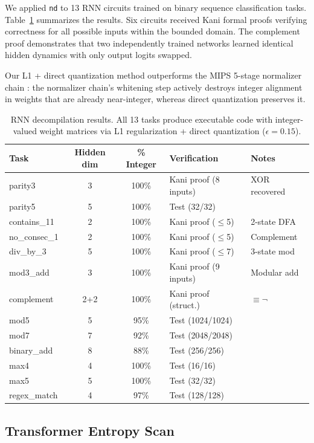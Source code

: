 \documentclass[11pt]{article}
\begin{document}
We applied \texttt{nd} to 13 RNN circuits trained on binary sequence classification tasks. Table~\ref{tab:rnn} summarizes the results. Six circuits received Kani formal proofs verifying correctness for all possible inputs within the bounded domain. The complement proof demonstrates that two independently trained networks learned identical hidden dynamics with only output logits swapped.

Our L1 + direct quantization method outperforms the MIPS 5-stage normalizer chain \cite{michaud2024}: the normalizer chain's whitening step actively destroys integer alignment in weights that are already near-integer, whereas direct quantization preserves it.

\begin{table}[t]
\centering
\caption{RNN decompilation results. All 13 tasks produce executable code with integer-valued weight matrices via L1 regularization + direct quantization ($\epsilon = 0.15$).}
\label{tab:rnn}
\small
\begin{tabular}{@{}lccll@{}}
\toprule
Task & Hidden dim & \% Integer & Verification & Notes \\
\midrule
parity3 & 3 & 100\% & Kani proof (8 inputs) & XOR recovered \\
parity5 & 5 & 100\% & Test (32/32) & \\
contains\_11 & 2 & 100\% & Kani proof ($\leq$5) & 2-state DFA \\
no\_consec\_1 & 2 & 100\% & Kani proof ($\leq$5) & Complement \\
div\_by\_3 & 5 & 100\% & Kani proof ($\leq$7) & 3-state mod \\
mod3\_add & 3 & 100\% & Kani proof (9 inputs) & Modular add \\
complement & 2+2 & 100\% & Kani proof (struct.) & $\equiv \neg$ \\
mod5 & 5 & 95\% & Test (1024/1024) & \\
mod7 & 7 & 92\% & Test (2048/2048) & \\
binary\_add & 8 & 88\% & Test (256/256) & \\
max4 & 4 & 100\% & Test (16/16) & \\
max5 & 5 & 100\% & Test (32/32) & \\
regex\_match & 4 & 97\% & Test (128/128) & \\
\bottomrule
\end{tabular}
\end{table}

\subsection{Transformer Entropy Scan}
\end{document}
